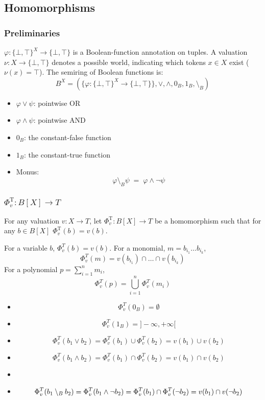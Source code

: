 \subsection{Homomorphisms}
\subsubsection{Preliminaries}
\(\varphi\colon \{\bot,\top\}^X \to \{\bot,\top\}\) is a Boolean-function annotation on tuples.
A valuation \(\nu\colon X \to \{\bot,\top\}\) denotes a possible world,
  indicating which tokens \(x\in X\) exist (\(\nu(x)=\top\)).
The semiring of Boolean functions is:
$$
B^X = (\{\varphi : \{ \bot,\top \}^X \to \{\bot,\top\}\},\vee,\wedge,0_B,1_B,\setminus_B)
$$
\begin{itemize}
    \item \(\varphi \vee \psi\): pointwise OR
    \item \(\varphi \wedge \psi\): pointwise AND
    \item \(0_B\): the constant-false function
    \item \(1_B\): the constant-true function
    \item Monus:
        $$
        \varphi \setminus_B \psi \;=\; \varphi \wedge \neg \psi
        $$
\end{itemize}
\subsubsection{$\Phi^{\mathrm{T}}_v : B[X] \to T$}
For any valuation $v:X \to T$, let $\Phi^{\mathrm{T}}_v : B[X] \to T$ be a homomorphism such that for any $b\in B[X]$ 
$\Phi^{\mathrm{T}}_v(b)=v(b)$.

For a variable $b$, $\Phi_v^T(b) = v(b)$.
For a monomial, $m = b_{i_1}\dots b_{i_k}$,
$$\Phi_v^T(m) = v(b_{i_1}) \cap \dots \cap v(b_{i_k})$$
For a polynomial $p = \sum_{i=1}^n m_i$,
$$\Phi_v^T(p) = \bigcup_{i=1}^n \Phi_v^T(m_i)$$
\begin{itemize}
    \item $$\Phi_v^T(0_{B}) = \emptyset$$
    \item $$\Phi_v^T(1_{B}) = ]-\infty, +\infty[$$
    \item $$\Phi_v^T(b_1 \vee b_2) = \Phi_v^T(b_1) \cup \Phi_v^T(b_2) = v(b_1)\cup v(b_2)$$
    \item $$\Phi_v^T(b_1 \wedge b_2) = \Phi_v^T(b_1) \cap \Phi_v^T(b_2) = v(b_1)\cap v(b_2)$$
    \item \item $$\Phi_v^T(b_1 \setminus_B b_2) = \Phi_v^T(b_1 \wedge \neg b_2) = \Phi_v^T(b_1)\cap \Phi_v^T(\neg b_2)\\
    = v(b_1)\cap v(\neg b_2)$$
\end{itemize}

